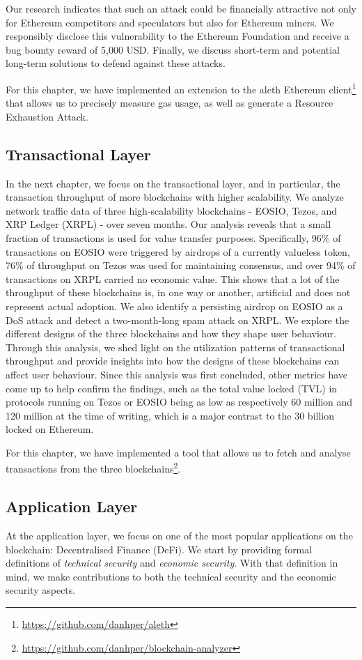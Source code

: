 Our research indicates that such an attack could be financially attractive not only for Ethereum competitors and speculators but also for Ethereum miners. We responsibly disclose this vulnerability to the Ethereum Foundation and receive a bug bounty reward of 5,000 USD. Finally, we discuss short-term and potential long-term solutions to defend against these attacks.

For this chapter, we have implemented an extension to the aleth Ethereum client\footnote{\url{https://github.com/danhper/aleth}} that allows us to precisely measure gas usage, as well as generate a Resource Exhaustion Attack.

\subsection{Transactional Layer}
In the next chapter, we focus on the transactional layer, and in particular, the transaction throughput of more blockchains with higher scalability.
We analyze network traffic data of three high-scalability blockchains - EOSIO, Tezos, and XRP Ledger (XRPL) - over seven months.
Our analysis reveals that a small fraction of transactions is used for value transfer purposes.
Specifically, 96\% of transactions on EOSIO were triggered by airdrops of a currently valueless token, 76\% of throughput on Tezos was used for maintaining consensus, and over 94\% of transactions on XRPL carried no economic value.
This shows that a lot of the throughput of these blockchains is, in one way or another, artificial and does not represent actual adoption.
We also identify a persisting airdrop on EOSIO as a DoS attack and detect a two-month-long spam attack on XRPL.
We explore the different designs of the three blockchains and how they shape user behaviour.
Through this analysis, we shed light on the utilization patterns of transactional throughput and provide insights into how the designs of these blockchains can affect user behaviour.
Since this analysis was first concluded, other metrics have come up to help confirm the findings, such as the total value locked (TVL) in protocols running on Tezos or EOSIO being as low as respectively 60 million and 120 million at the time of writing, which is a major contrast to the 30 billion locked on Ethereum.

For this chapter, we have implemented a tool that allows us to fetch and analyse transactions from the three blockchains\footnote{\url{https://github.com/danhper/blockchain-analyzer}}.

\subsection{Application Layer}
At the application layer, we focus on one of the most popular applications on the blockchain: Decentralised Finance (DeFi).
We start by providing formal definitions of \emph{technical security} and \emph{economic security}.
With that definition in mind, we make contributions to both the technical security and the economic security aspects.

